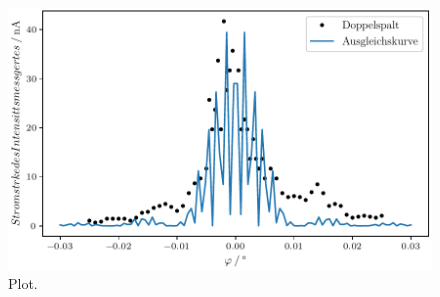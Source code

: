 
\begin{figure}
  \centering
  \includegraphics{plot2.pdf}
  \caption{Plot.}
  \label{fig:plot}
\end{figure}

